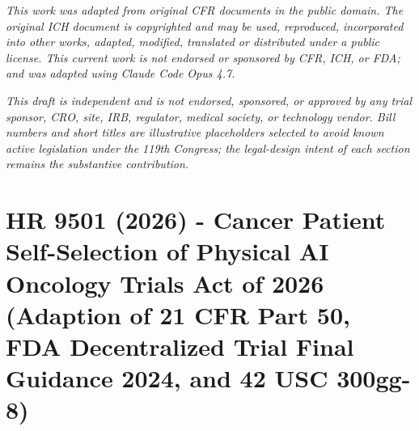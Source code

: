 \documentclass[11pt,letterpaper]{article}
\begin{document}
\vspace{0.15em}

\begin{center}
\footnotesize
\textit{This work was adapted from original CFR documents in the public
domain. The original ICH document is copyrighted and may be used,
reproduced, incorporated into other works, adapted, modified,
translated or distributed under a public license. This current work
is not endorsed or sponsored by CFR, ICH, or FDA; and was adapted
using Claude Code Opus 4.7.}
\end{center}

\vspace{0.15em}

\begin{center}
\footnotesize
\textit{This draft is independent and is not endorsed, sponsored, or
approved by any trial sponsor, CRO, site, IRB, regulator, medical
society, or technology vendor. Bill numbers and short titles are
illustrative placeholders selected to avoid known active legislation
under the 119th Congress; the legal-design intent of each section
remains the substantive contribution.}
\end{center}

\vspace{0.6em}

\renewcommand{\contentsname}{\centering\large\bfseries\scshape Table of Contents}
\begingroup
\small
\setlength{\parskip}{0pt}
\tableofcontents
\endgroup

\newpage

%

\section{HR 9501 (2026) - Cancer Patient Self-Selection of Physical AI Oncology Trials Act of 2026 (Adaption of 21 CFR Part 50, FDA Decentralized Trial Final Guidance 2024, and 42 USC 300gg-8)}
\label{sec:hr9501}

\newpage
\end{document}
